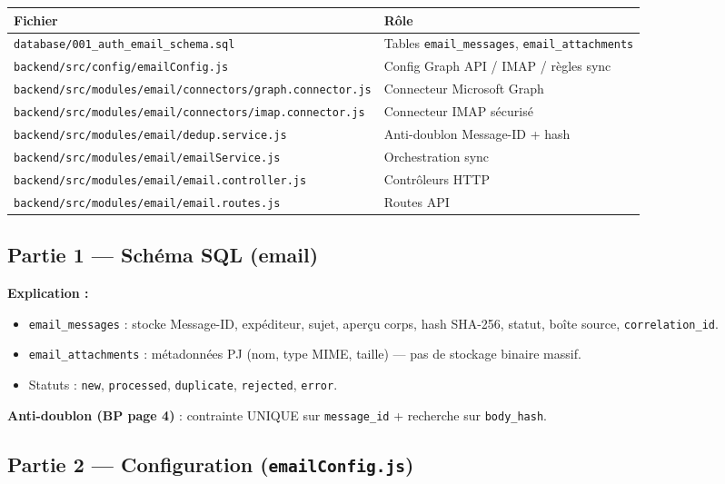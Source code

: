 \documentclass[12pt,a4paper]{article}
\begin{document}
\begin{tabular}{@{}ll@{}}
\toprule
Fichier & Rôle \\
\midrule
\texttt{database/001\_auth\_email\_schema.sql} & Tables \texttt{email\_messages}, \texttt{email\_attachments} \\
\texttt{backend/src/config/emailConfig.js} & Config Graph API / IMAP / règles sync \\
\texttt{backend/src/modules/email/connectors/graph.connector.js} & Connecteur Microsoft Graph \\
\texttt{backend/src/modules/email/connectors/imap.connector.js} & Connecteur IMAP sécurisé \\
\texttt{backend/src/modules/email/dedup.service.js} & Anti-doublon Message-ID + hash \\
\texttt{backend/src/modules/email/emailService.js} & Orchestration sync \\
\texttt{backend/src/modules/email/email.controller.js} & Contrôleurs HTTP \\
\texttt{backend/src/modules/email/email.routes.js} & Routes API \\
\bottomrule
\end{tabular}

\subsection{Partie 1 --- Schéma SQL (email)}

\textbf{Explication :}

\begin{itemize}
  \item \texttt{email\_messages} : stocke Message-ID, expéditeur, sujet, aperçu corps, hash SHA-256, statut, boîte source, \texttt{correlation\_id}.
  \item \texttt{email\_attachments} : métadonnées PJ (nom, type MIME, taille) --- pas de stockage binaire massif.
  \item Statuts : \texttt{new}, \texttt{processed}, \texttt{duplicate}, \texttt{rejected}, \texttt{error}.
\end{itemize}

\textbf{Anti-doublon (BP page 4)} : contrainte UNIQUE sur \texttt{message\_id} + recherche sur \texttt{body\_hash}.

\subsection{Partie 2 --- Configuration (\texttt{emailConfig.js})}
\end{document}
